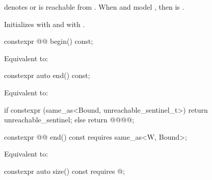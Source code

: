 \begin{itemdescr}
\pnum
\expects
{} denotes  or
 is reachable from .
When  and  model ,
then  is .

\pnum
\effects
Initializes  with  and
 with .
\end{itemdescr}

%
\begin{itemdecl}
constexpr @@ begin() const;
\end{itemdecl}

\begin{itemdescr}
\pnum
\effects
Equivalent to: 
\end{itemdescr}

%
\begin{itemdecl}
constexpr auto end() const;
\end{itemdecl}

\begin{itemdescr}
\pnum
\effects
Equivalent to:
\begin{codeblock}
if constexpr (same_as<Bound, unreachable_sentinel_t>)
  return unreachable_sentinel;
else
  return @@{@@};
\end{codeblock}
\end{itemdescr}

%
\begin{itemdecl}
constexpr @@ end() const requires same_as<W, Bound>;
\end{itemdecl}

\begin{itemdescr}
\pnum
\effects
Equivalent to: 
\end{itemdescr}

%
\begin{itemdecl}
constexpr auto size() const requires @\seebelow@;
\end{itemdecl}

